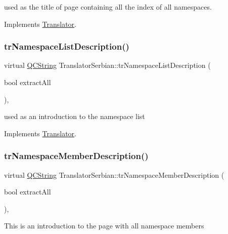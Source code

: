 used as the title of page containing all the index of all namespaces. 

Implements \mbox{\hyperlink{class_translator}{Translator}}.

\mbox{\label{class_translator_serbian_a146e848ee8774bcd5c786aae526b4011}} 
\subsubsection{\texorpdfstring{trNamespaceListDescription()}{trNamespaceListDescription()}}
{\footnotesize\ttfamily virtual \mbox{\hyperlink{class_q_c_string}{Q\+C\+String}} Translator\+Serbian\+::tr\+Namespace\+List\+Description (\begin{DoxyParamCaption}\item[{bool}]{extract\+All }\end{DoxyParamCaption})\hspace{0.3cm}{\ttfamily [inline]}, {\ttfamily [virtual]}}

used as an introduction to the namespace list 

Implements \mbox{\hyperlink{class_translator}{Translator}}.

\mbox{\label{class_translator_serbian_a852f7f80f8d735683d22ee514e3ef0fd}} 
\subsubsection{\texorpdfstring{trNamespaceMemberDescription()}{trNamespaceMemberDescription()}}
{\footnotesize\ttfamily virtual \mbox{\hyperlink{class_q_c_string}{Q\+C\+String}} Translator\+Serbian\+::tr\+Namespace\+Member\+Description (\begin{DoxyParamCaption}\item[{bool}]{extract\+All }\end{DoxyParamCaption})\hspace{0.3cm}{\ttfamily [inline]}, {\ttfamily [virtual]}}

This is an introduction to the page with all namespace members 

